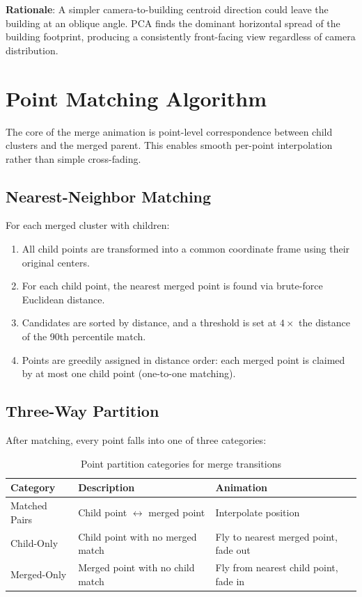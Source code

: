 \documentclass[11pt, letterpaper]{article}
\begin{document}
\textbf{Rationale}: A simpler camera-to-building centroid direction could leave the building at an oblique angle. PCA finds the dominant horizontal spread of the building footprint, producing a consistently front-facing view regardless of camera distribution.

\section{Point Matching Algorithm}

The core of the merge animation is point-level correspondence between child clusters and the merged parent. This enables smooth per-point interpolation rather than simple cross-fading.

\subsection{Nearest-Neighbor Matching}

For each merged cluster with children:
\begin{enumerate}
    \item All child points are transformed into a common coordinate frame using their original centers.
    \item For each child point, the nearest merged point is found via brute-force Euclidean distance.
    \item Candidates are sorted by distance, and a threshold is set at $4 \times$ the distance of the 90th percentile match.
    \item Points are greedily assigned in distance order: each merged point is claimed by at most one child point (one-to-one matching).
\end{enumerate}

\subsection{Three-Way Partition}

After matching, every point falls into one of three categories:

\begin{table}[H]
\centering
\caption{Point partition categories for merge transitions}
\begin{tabular}{@{}lll@{}}
\toprule
\textbf{Category} & \textbf{Description} & \textbf{Animation} \\
\midrule
Matched Pairs & Child point $\leftrightarrow$ merged point & Interpolate position \\
Child-Only & Child point with no merged match & Fly to nearest merged point, fade out \\
Merged-Only & Merged point with no child match & Fly from nearest child point, fade in \\
\bottomrule
\end{tabular}
\end{table}
\end{document}
